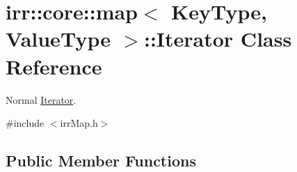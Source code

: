 \hypertarget{classirr_1_1core_1_1map_1_1Iterator}{}\section{irr\+:\+:core\+:\+:map$<$ Key\+Type, Value\+Type $>$\+:\+:Iterator Class Reference}
\label{classirr_1_1core_1_1map_1_1Iterator}


Normal \hyperlink{classirr_1_1core_1_1map_1_1Iterator}{Iterator}.  




{\ttfamily \#include $<$irr\+Map.\+h$>$}

\subsection*{Public Member Functions}
